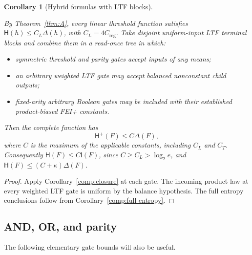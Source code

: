 \documentclass[11pt]{amsart}
\newtheorem{corollary}[theorem]{Corollary}
\theoremstyle{definition}
\theoremstyle{remark}
\newcommand{\HH}{\mathsf H}
\newcommand{\I}{\mathsf I}
\newcommand{\Creg}{C_{\mathrm{reg}}}
\begin{document}
\begin{corollary}[Hybrid formulas with LTF blocks]\label{comp:hybrid}

By Theorem~\ref{thm:A}, every linear threshold function satisfies \(\HH(h)\le C_L\Delta(h)\), with \(C_L=4\Creg\). Take disjoint uniform-input LTF terminal blocks and combine them in a read-once tree in which:

\begin{itemize}
\item
  symmetric threshold and parity gates accept inputs of any means;
\item
  an arbitrary weighted LTF gate may accept balanced nonconstant child outputs;
\item
  fixed-arity arbitrary Boolean gates may be included with their established product-biased FEI+ constants.
\end{itemize}

Then the complete function has \[
 \HH^+(F)\le C \Delta(F),
\] where \(C\) is the maximum of the applicable constants, including \(C_L\) and \(C_T\). Consequently \(\HH(F)\le C\I(F)\), since \(C\ge C_L>\log_2e\), and \(\HH(F)\le(C+\kappa)\Delta(F)\).

\end{corollary}
\begin{proof}

Apply Corollary~\ref{comp:closure} at each gate. The incoming product law at every weighted LTF gate is uniform by the balance hypothesis. The full entropy conclusions follow from Corollary~\ref{comp:full-entropy}.

\end{proof}

\subsection{AND, OR, and parity}\label{comp:elementary-section}

The following elementary gate bounds will also be useful.
\end{document}
